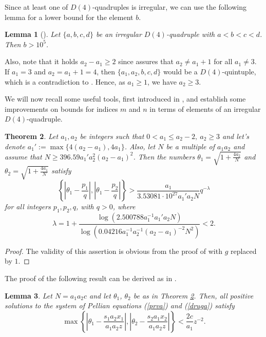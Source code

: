 \documentclass[12pt]{amsart}%
\newtheorem{theorem}{Theorem}[section]
\newtheorem{lemma}[theorem]{Lemma}
\theoremstyle{definition}
\theoremstyle{remark}
\theoremstyle{plain}
\begin{document}
Since at least one of $D(4)$-quadruples is irregular, we can use the following lemma for a lower bound for the element $b$.

\begin{lemma}[{\cite[Lemma 2.2]{mbt}}]
    Let $\{a,b,c,d\}$ be an irregular $D(4)$-quadruple with $a<b<c<d$. Then $b>10^5$.
\end{lemma}

Also, note that it holds $a_2-a_1 \geq 2$ since  \cite[Theorem 1.1]{mbtap1} assures that $a_2 \neq a_1 + 1$ for all $a_1 \neq 3$. If $a_1 = 3$ and $a_2=a_1+1=4$, then $\{a_1,a_2,b,c,d\}$ would be a $D(4)$-quintuple, which is a contradiction to \cite[Theorem 1]{nas2}. Hence, as $a_1 \geq 1$, we have $a_2 \geq 3$.

\smallskip


We will now recall some useful tools, first introduced in \cite{rickert}, and establish some improvements on bounds for indices $m$ and $n$ in terms of elements of an irregular $D(4)$-quadruple.

\begin{theorem}\label{tm: gornje_ograde}
Let $a_1,a_2$ be integers such that $0<a_1 \leq a_2-2,\ a_2 \geq 3$ and let's denote $a_1' := \max\{4(a_2-a_1),4a_1\}$. Also, let $N$ be a multiple of $a_1a_2$ and assume that $N \geq 396.59a_1'a_2^2(a_2-a_1)^2$. Then the numbers $\theta_1 = \sqrt{1+\frac{4a_2}{N}}$ and $\theta_2 = \sqrt{1+\frac{4a_1}{N}}$ satisfy
$$ \left\{ \left| \theta_1-\frac{p_1}{q} \right| , \left|\theta_1-\frac{p_2}{q} \right|     \right\} > \frac{a_1}{3.53081 \cdot 10^{27} a_1'a_2N}q^{-\lambda}$$
for all integers $p_1,p_2,q$, with $q>0$, where 
\[\lambda=1+\frac{\log(2.500788a_1^{-1}a_1'a_2N)}{\log(0.04216a_1^{-1}a_2^{-1}(a_2-a_1)^{-2}N^2)}<2.\]
\end{theorem}
\begin{proof}
The validity of this assertion is obvious from the proof of \cite[Theorem 2]{nas2} with $g$ replaced by $1$.
\end{proof}
The proof of the following result can be derived  as in \cite[Lemma 6]{dujram}.
\begin{lemma}\label{gornje_ograde2}
Let $N=a_1a_2c$ and let $\theta_1$, $\theta_2$ be as in Theorem \ref{tm: gornje_ograde}. Then, all positive solutions to the system of Pellian equations (\ref{prva}) and (\ref{druga}) satisfy
$$\max\left\{\left|\theta_1-\frac{s_1a_2x_1}{a_1a_2z}\right|,\left|\theta_2-\frac{s_2a_1x_2}{a_1a_2z}\right|\right\}<\frac{2c}{a_1}z^{-2}.$$
\end{lemma}
\end{document}
